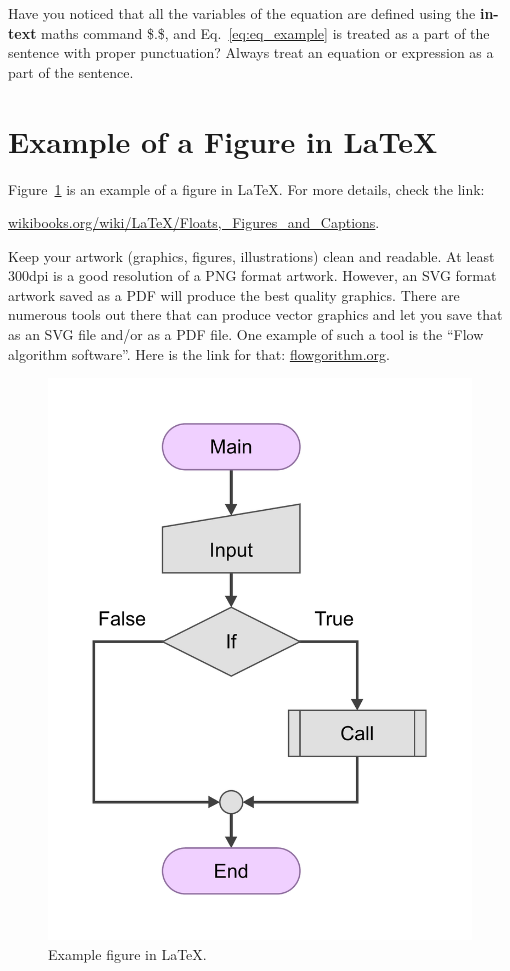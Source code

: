 Have you noticed that all the variables of the equation are defined using the \textbf{in-text} maths command \$.\$, and Eq.~\eqref{eq:eq_example} is treated as a part of the sentence with proper punctuation? Always treat an equation or expression as a part of the sentence. 

\section{Example of a Figure in \LaTeX}
Figure~\ref{fig:chart_a} is an example of a figure in \LaTeX. For more details, check the link:

\href{https://en.wikibooks.org/wiki/LaTeX/Floats,_Figures_and_Captions}{wikibooks.org/wiki/LaTeX/Floats,\_Figures\_and\_Captions}.

\noindent
Keep your artwork (graphics, figures, illustrations) clean and readable. At least 300dpi is a good resolution of a PNG format artwork. However, an SVG format artwork saved as a PDF will produce the best quality graphics. There are numerous tools out there that can produce vector graphics and let you save that as an SVG file and/or as a PDF file. One example of such a tool is the ``Flow algorithm software''. Here is the link for that: \href{http://www.flowgorithm.org/download/}{flowgorithm.org}.
\begin{figure}[!ht]
    \centering
    \includegraphics[scale=0.3]{figures/chart.pdf}
    \caption{Example figure in \LaTeX.}
    \label{fig:chart_a}
\end{figure}

